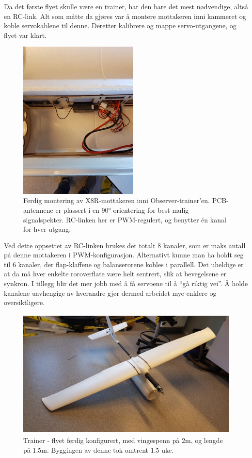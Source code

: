 \documentclass[12pt, a4paper]{article}
\begin{document}
Da det første flyet skulle være en trainer, har den bare det mest nødvendige, altså en RC-link. Alt som måtte da gjøres var å montere mottakeren inni kammeret og koble servokablene til denne. Deretter kalibrere og mappe servo-utgangene, og flyet var klart.

\begin{figure}[ht]
	\centering
	\includegraphics[height=8cm, width = .6\textwidth]{bilder/mottakermontering.jpg}
	\caption[Mottaker-montering]{Ferdig montering av X8R-mottakeren inni Observer-trainer'en. PCB-antennene er plassert i en \ang{90}-orientering for best mulig signalspekter. RC-linken her er PWM-regulert, og benytter én kanal for hver utgang.}
\end{figure}
\newpage

Ved dette oppsettet av RC-linken brukes det totalt 8 kanaler, som er maks antall på denne mottakeren i PWM-konfigurasjon. Alternativt kunne man ha holdt seg til 6 kanaler, der flap-klaffene og balanserorene kobles i parallell. Det uheldige er at da må hver enkelte roroverflate være helt sentrert, slik at bevegelsene er synkron. I tillegg blir det mer jobb med å få servoene til å ``gå riktig vei''. Å holde kanalene uavhengige av hverandre gjør dermed arbeidet mye enklere og oversiktligere. 

\begin{figure}[ht]
	\centering
	\includegraphics[width=.6\textwidth, height = 6.5cm]{bilder/forste_fly_ferdigstilt.jpg}
	\caption[Trainer-fly]{Trainer - flyet ferdig konfigurert, med vingespenn på 2m, og lengde på 1.5m. Byggingen av denne tok omtrent 1.5 uke. }
\end{figure}
\end{document}

